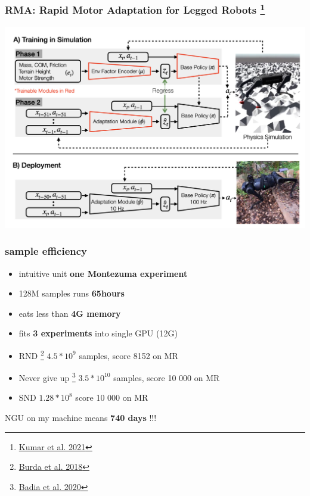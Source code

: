 \documentclass{beamer}
\begin{document}
\begin{frame}
  
  \frametitle{RMA: Rapid Motor Adaptation for Legged Robots \footnote{\href{https://arxiv.org/pdf/2107.04034.pdf}{Kumar et al. 2021}}}
 
  \includegraphics[scale=0.25]{../images/rma.png}

\end{frame}

\begin{frame}
  
  \frametitle{sample efficiency}

  \begin{itemize}
    \item intuitive unit {\bf one Montezuma experiment}
    \item 128M samples runs {\bf 65hours}
    \item eats less than {\bf 4G memory}
    \item fits {\bf 3 experiments} into single GPU (12G)
  \end{itemize}

  \bigskip

  \begin{itemize}
    \item RND \footnote{\href{https://arxiv.org/pdf/1810.12894.pdf}{Burda et al. 2018}} $4.5*10^9$ samples, score 8152 on MR
    \item Never give up \footnote{\href{https://arxiv.org/pdf/2002.06038.pdf}{Badia et al. 2020}} $3.5*10^{10}$ samples, score 10 000 on MR
    \item SND $1.28*10^8$ score 10 000 on MR 
  \end{itemize}

  NGU on my machine means {\bf 740 days} !!!
\end{frame}
\end{document}
